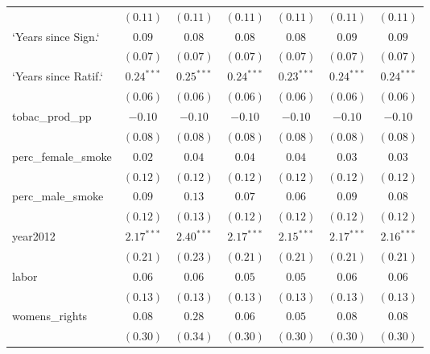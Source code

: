 \begin{table}[!h]
\begin{center}
\begin{tabular}{l c c c c c c }
                        & $(0.11)$     & $(0.11)$     & $(0.11)$     & $(0.11)$     & $(0.11)$     & $(0.11)$     \\
`Years since Sign.`     & $0.09$       & $0.08$       & $0.08$       & $0.08$       & $0.09$       & $0.09$       \\
                        & $(0.07)$     & $(0.07)$     & $(0.07)$     & $(0.07)$     & $(0.07)$     & $(0.07)$     \\
`Years since Ratif.`    & $0.24^{***}$ & $0.25^{***}$ & $0.24^{***}$ & $0.23^{***}$ & $0.24^{***}$ & $0.24^{***}$ \\
                        & $(0.06)$     & $(0.06)$     & $(0.06)$     & $(0.06)$     & $(0.06)$     & $(0.06)$     \\
tobac\_prod\_pp         & $-0.10$      & $-0.10$      & $-0.10$      & $-0.10$      & $-0.10$      & $-0.10$      \\
                        & $(0.08)$     & $(0.08)$     & $(0.08)$     & $(0.08)$     & $(0.08)$     & $(0.08)$     \\
perc\_female\_smoke     & $0.02$       & $0.04$       & $0.04$       & $0.04$       & $0.03$       & $0.03$       \\
                        & $(0.12)$     & $(0.12)$     & $(0.12)$     & $(0.12)$     & $(0.12)$     & $(0.12)$     \\
perc\_male\_smoke       & $0.09$       & $0.13$       & $0.07$       & $0.06$       & $0.09$       & $0.08$       \\
                        & $(0.12)$     & $(0.13)$     & $(0.12)$     & $(0.12)$     & $(0.12)$     & $(0.12)$     \\
year2012                & $2.17^{***}$ & $2.40^{***}$ & $2.17^{***}$ & $2.15^{***}$ & $2.17^{***}$ & $2.16^{***}$ \\
                        & $(0.21)$     & $(0.23)$     & $(0.21)$     & $(0.21)$     & $(0.21)$     & $(0.21)$     \\
labor                   & $0.06$       & $0.06$       & $0.05$       & $0.05$       & $0.06$       & $0.06$       \\
                        & $(0.13)$     & $(0.13)$     & $(0.13)$     & $(0.13)$     & $(0.13)$     & $(0.13)$     \\
womens\_rights          & $0.08$       & $0.28$       & $0.06$       & $0.05$       & $0.08$       & $0.08$       \\
                        & $(0.30)$     & $(0.34)$     & $(0.30)$     & $(0.30)$     & $(0.30)$     & $(0.30)$     \\

\end{tabular}
\end{center}
\end{table}
